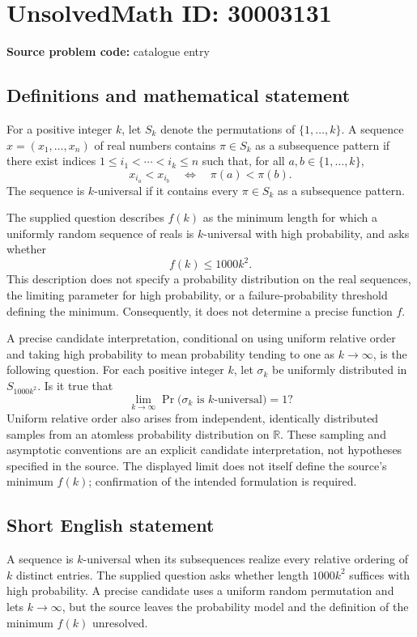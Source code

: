 \documentclass[11pt]{article}
\newcommand{\R}{\mathbb{R}}
\begin{document}
\section*{UnsolvedMath ID: 30003131}
\textbf{Source problem code:} catalogue entry
\subsection{Definitions and mathematical statement}
For a positive integer \(k\), let \(S_k\) denote the permutations of \(\{1,\ldots,k\}\). A sequence \(x=(x_1,\ldots,x_n)\) of real numbers contains \(\pi\in S_k\) as a subsequence pattern if there exist indices \(1\le i_1<\cdots<i_k\le n\) such that, for all \(a,b\in\{1,\ldots,k\}\),
\[
 x_{i_a}<x_{i_b}\quad\Longleftrightarrow\quad \pi(a)<\pi(b).
\]
The sequence is \(k\)-universal if it contains every \(\pi\in S_k\) as a subsequence pattern.

The supplied question describes \(f(k)\) as the minimum length for which a uniformly random sequence of reals is \(k\)-universal with high probability, and asks whether
\[
 f(k)\le 1000k^2.
\]
This description does not specify a probability distribution on the real sequences, the limiting parameter for high probability, or a failure-probability threshold defining the minimum. Consequently, it does not determine a precise function \(f\).

A precise candidate interpretation, conditional on using uniform relative order and taking high probability to mean probability tending to one as \(k\to\infty\), is the following question. For each positive integer \(k\), let \(\sigma_k\) be uniformly distributed in \(S_{1000k^2}\). Is it true that
\[
 \lim_{k\to\infty}\Pr\bigl(\sigma_k\text{ is }k\text{-universal}\bigr)=1?
\]
Uniform relative order also arises from independent, identically distributed samples from an atomless probability distribution on \(\R\). These sampling and asymptotic conventions are an explicit candidate interpretation, not hypotheses specified in the source. The displayed limit does not itself define the source's minimum \(f(k)\); confirmation of the intended formulation is required.
\subsection{Short English statement}
A sequence is \(k\)-universal when its subsequences realize every relative ordering of \(k\) distinct entries. The supplied question asks whether length \(1000k^2\) suffices with high probability. A precise candidate uses a uniform random permutation and lets \(k\to\infty\), but the source leaves the probability model and the definition of the minimum \(f(k)\) unresolved.
\end{document}
